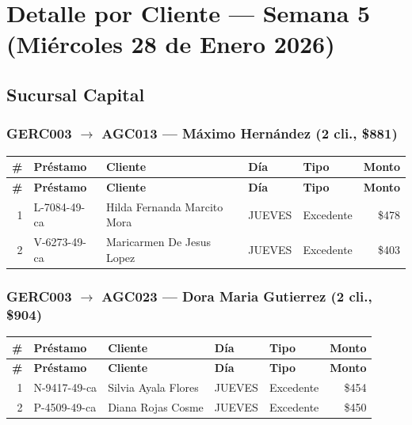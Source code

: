 \documentclass[11pt,a4paper]{article}
\newcommand{\money}[1]{\$\num{#1}}
\begin{document}
\begin{center}
\begin{longtable}{llrrrrrrrr}
\bottomrule
\end{longtable}
\end{center}

\newpage
\section{Detalle por Cliente --- Semana 5 (Mi\'ercoles 28 de Enero 2026)}

\subsection{Sucursal Capital}

\subsubsection{GERC003 $\rightarrow$ AGC013 --- Máximo Hernández (2 cli., \money{881})}


\begin{center}
\renewcommand{\arraystretch}{1.1}
\footnotesize
\begin{longtable}{rlp{5.5cm}llr}
\toprule
\textbf{\#} & \textbf{Pr\'estamo} & \textbf{Cliente} & \textbf{D\'ia} & \textbf{Tipo} & \textbf{Monto} \\
\midrule
\endfirsthead
\toprule
\textbf{\#} & \textbf{Pr\'estamo} & \textbf{Cliente} & \textbf{D\'ia} & \textbf{Tipo} & \textbf{Monto} \\
\midrule
\endhead
1 & L-7084-49-ca & Hilda Fernanda Marcito Mora & JUEVES & Excedente & \money{478} \\
2 & V-6273-49-ca & Maricarmen De Jesus Lopez & JUEVES & Excedente & \money{403} \\

\bottomrule
\end{longtable}
\end{center}
\subsubsection{GERC003 $\rightarrow$ AGC023 --- Dora Maria Gutierrez (2 cli., \money{904})}


\begin{center}
\renewcommand{\arraystretch}{1.1}
\footnotesize
\begin{longtable}{rlp{5.5cm}llr}
\toprule
\textbf{\#} & \textbf{Pr\'estamo} & \textbf{Cliente} & \textbf{D\'ia} & \textbf{Tipo} & \textbf{Monto} \\
\midrule
\endfirsthead
\toprule
\textbf{\#} & \textbf{Pr\'estamo} & \textbf{Cliente} & \textbf{D\'ia} & \textbf{Tipo} & \textbf{Monto} \\
\midrule
\endhead
1 & N-9417-49-ca & Silvia Ayala Flores & JUEVES & Excedente & \money{454} \\
2 & P-4509-49-ca & Diana Rojas Cosme & JUEVES & Excedente & \money{450} \\

\bottomrule
\end{longtable}
\end{center}
\end{document}
